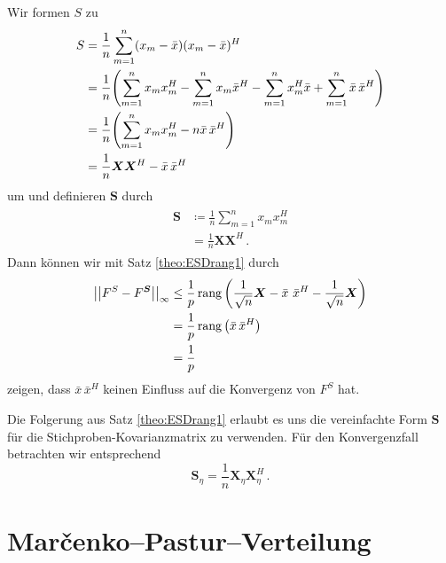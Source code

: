 \documentclass[../Bachelor_LennartKoliwer.tex]{subfiles}
\begin{document}
Wir formen $S$ zu
\begin{align*}
    S  &=  \frac{1}{n}\sum_{m=1}^{n}(x_m-\bar{x})(x_m-\bar{x})^H \\
            &=  \frac{1}{n}\lr{\sum_{m=1}^{n}x_mx_m^H-\sum_{m=1}^{n}x_m\bar{x}^H-\sum_{m=1}^{n}x_m^H\bar{x}+\sum_{m=1}^{n}\bar{x}\,\bar{x}^H} \\
            &=  \frac{1}{n}\lr{\sum_{m=1}^{n}x_mx_m^H - n\bar{x}\,\bar{x}^H}\\
            &= \frac1n \bm{X}\bm{X}^H - \bar{x}\,\bar{x}^H
\end{align*}
um und definieren $\bm{S}$ durch
\begin{align}
    \begin{split}
        \bm{S}&\coloneqq\frac{1}{n}\sum_{m=1}^{n}x_mx_m^H\\ 
    &= \frac1n \bm{X}\bm{X}^H\,.
    \end{split}\label{eq:StichKovarEinfach}
\end{align}
Dann können wir mit Satz \ref{theo:ESDrang1} durch 
\begin{align*}
    \dabs{F^{S}-F^{\bm{S}}}_\infty &\leq \frac1p\rang\lr{\frac{1}{\sqrt{n}}\bm{X}-\bar{x}\
    \bar{x}^H-\frac{1}{\sqrt{n}}\bm{X}} \\
    &= \frac1p\rang\lr{\bar{x}\,\bar{x}^H}\\
    &= \frac1p
\end{align*}
zeigen, dass $\bar{x}\,\bar{x}^H$ keinen Einfluss auf die Konvergenz von $F^S$ hat.

\begin{remark}
Die Folgerung aus Satz \ref{theo:ESDrang1} erlaubt es uns die vereinfachte Form $\bm{S}$ für die Stichproben-Kovarianzmatrix zu verwenden.
Für den Konvergenzfall betrachten wir entsprechend 
\[
    \bm{S}_\eta = \frac1n \bm{X}_\eta\bm{X}_\eta^H\,.
\]
\end{remark}








\section{Mar\v{c}enko--Pastur--Verteilung}\label{kap:MarchenkoPastur}
\end{document}
